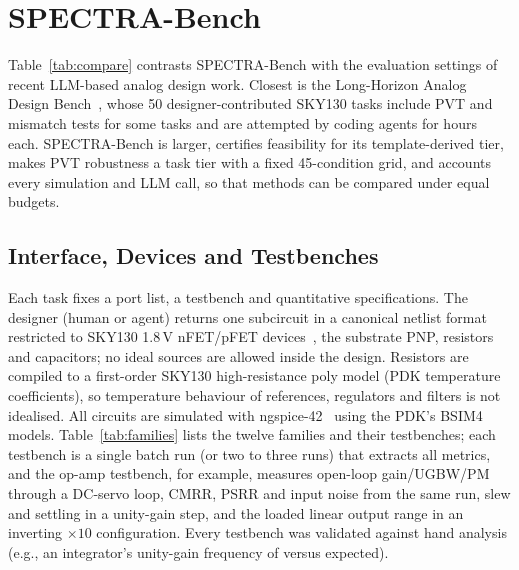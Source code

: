 \section{SPECTRA-Bench}
\label{sec:bench}

Table~\ref{tab:compare} contrasts SPECTRA-Bench with the evaluation settings of recent LLM-based analog design work.
Closest is the Long-Horizon Analog Design Bench~\cite{adbench2026longhorizon}, whose 50 designer-contributed SKY130
tasks include PVT and mismatch tests for some tasks and are attempted by coding agents for hours each. SPECTRA-Bench
is larger, certifies feasibility for its template-derived tier, makes PVT robustness a task tier with a fixed
45-condition grid, and accounts every simulation and LLM call, so that methods can be compared under equal budgets.

\subsection{Interface, Devices and Testbenches}
Each task fixes a port list, a testbench and quantitative specifications. The designer (human or agent) returns one
subcircuit in a canonical netlist format restricted to SKY130 1.8\,V nFET/pFET devices~\cite{sky130pdk}, the
substrate PNP, resistors and capacitors; no ideal sources are allowed inside the design. Resistors are compiled to a
first-order SKY130 high-resistance poly model (PDK temperature coefficients), so temperature behaviour of
references, regulators and filters is not idealised. All circuits are simulated with ngspice-42~\cite{ngspice42}
using the PDK's BSIM4 models. Table~\ref{tab:families} lists the twelve families and their testbenches; each
testbench is a single batch run (or two to three runs) that extracts all metrics, and the op-amp testbench, for
example, measures open-loop gain/UGBW/PM through a DC-servo loop, CMRR, PSRR and input noise from the same run,
slew and settling in a unity-gain step, and the loaded linear output range in an inverting $\times10$
configuration. Every testbench was validated against hand analysis (e.g., an integrator's unity-gain frequency of
\TBIntegSim{} versus \TBIntegIdeal{} expected).



